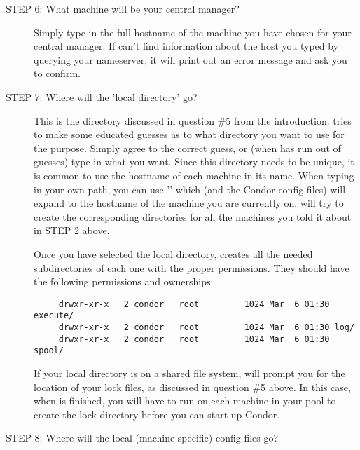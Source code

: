 \begin{description}

\item[STEP 6: What machine will be your central manager?]

     Simply type in the full hostname of the machine you have chosen
     for your central manager.  If  can't find
     information about the host you typed by querying your nameserver,
     it will print out an error message and ask you to confirm.


\item[STEP 7: Where will the 'local directory' go?]

     This is the directory discussed in question \#5 from the
     introduction.   tries to make some educated guesses
     as to what directory you want to use for the purpose.  Simply
     agree to the correct guess, or (when  has run out
     of guesses) type in what you want.  Since this directory needs to
     be unique, it is common to use the hostname of each machine in
     its name.  When typing in your own path, you can use
     '' which  (and the Condor config files)
     will expand to the hostname of the machine you are currently on.
      will try to create the corresponding directories
     for all the machines you told it about in STEP 2 above.

     Once you have selected the local directory, 
     creates all the needed subdirectories of each one with the proper
     permissions.  They should have the following permissions and
     ownerships:

\begin{verbatim}
     drwxr-xr-x   2 condor   root         1024 Mar  6 01:30 execute/
     drwxr-xr-x   2 condor   root         1024 Mar  6 01:30 log/
     drwxr-xr-x   2 condor   root         1024 Mar  6 01:30 spool/
\end{verbatim}

     If your local directory is on a shared file system,
      will prompt you for the location of your lock
     files, as discussed in question \#5 above.  In this case, when
      is finished, you will have to run  on
     each machine in your pool to create the lock directory before you
     can start up Condor.


\item[STEP 8: Where will the local (machine-specific) config files go?]


\end{description}
